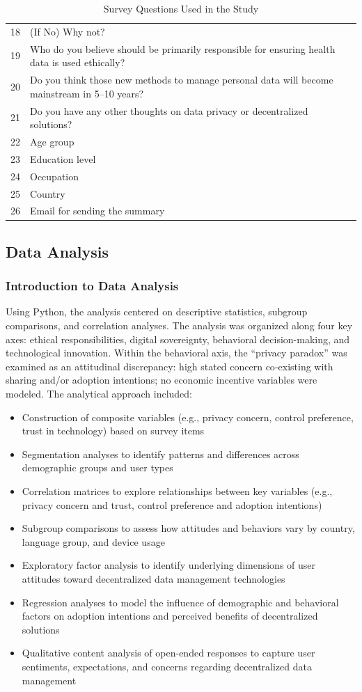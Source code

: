 \begin{table}[ht]
\begin{tabular}{p{1.5cm} p{13cm}}
			18 & (If No) Why not? \\
			19 & Who do you believe should be primarily responsible for ensuring health data is used ethically? \\
			20 & Do you think those new methods to manage personal data will become mainstream in 5–10 years? \\
			21 & Do you have any other thoughts on data privacy or decentralized solutions? \\
			22 & Age group \\
			23 & Education level \\
			24 & Occupation \\
			25 & Country \\
			26 & Email for sending the summary \\
			\bottomrule
		\end{tabular}
		\caption{Survey Questions Used in the Study}
		\label{tab:survey_questions}
	\end{table}
	\clearpage
\subsection{Data Analysis}
	\subsubsection{Introduction to Data Analysis}
	Using Python, the analysis centered on descriptive statistics, subgroup comparisons, and correlation analyses. The analysis was organized along four key axes: ethical responsibilities, digital sovereignty, behavioral decision-making, and technological innovation. Within the behavioral axis, the “privacy paradox” was examined as an attitudinal discrepancy: high stated concern co‑existing with sharing and/or adoption intentions; no economic incentive variables were modeled.
	The analytical approach included:
	\begin{itemize}
		\item Construction of composite variables (e.g., privacy concern, control preference, trust in technology) based on survey items
		\item Segmentation analyses to identify patterns and differences across demographic groups and user types
		\item Correlation matrices to explore relationships between key variables (e.g., privacy concern and trust, control preference and adoption intentions)
		\item Subgroup comparisons to assess how attitudes and behaviors vary by country, language group, and device usage
		\item Exploratory factor analysis to identify underlying dimensions of user attitudes toward decentralized data management technologies
		\item Regression analyses to model the influence of demographic and behavioral factors on adoption intentions and perceived benefits of decentralized solutions
		\item Qualitative content analysis of open-ended responses to capture user sentiments, expectations, and concerns regarding decentralized data management
	\end{itemize}
